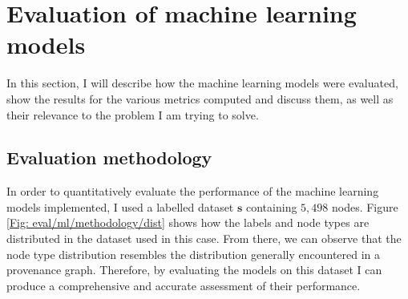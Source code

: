 	\section{Evaluation of machine learning models} \label{Section: eval/ml}
		In this section, I will describe how the machine learning models were evaluated, show the results for the various metrics computed and discuss them, as well as their relevance to the problem I am trying to solve.
		
	\subsection{Evaluation methodology} \label{Section: eval/ml/methodology}
		In order to quantitatively evaluate the performance of the machine learning models implemented, I used a labelled dataset $\mathbf{s}$ containing $5,498$ nodes. Figure \ref{Fig: eval/ml/methodology/dist} shows how the labels and node types are distributed in the dataset used in this case. From there, we can observe that the node type distribution resembles the distribution generally encountered in a provenance graph. Therefore, by evaluating the models on this dataset I can produce a comprehensive and accurate assessment of their performance. 
